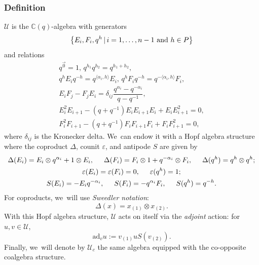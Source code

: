 \documentclass[JEP,XML,SOM,Unicode,published]{cedram}
\let\epsilon\varepsilon
\theoremstyle{definition}
\newcommand{\CC}{\mathbb{C}}
\newcommand{\UU}{\mathcal{U}}
\newcommand{\ad}{\mathrm{ad}}
\begin{document}
\subsubsection{Definition}
$\mathcal{U}$ is the $\CC(q)$-algebra with generators
\[
\left\{ E_i, F_i, q^h\, |\, i=1,\ldots, n-1\hbox{ and }h\in P \right\}
\]
and relations
\begin{gather*}
q^{\vec{0}}=1,\,q^{h_1}q^{h_2}=q^{h_1+h_2},\\
q^hE_iq^{-h}=q^{\langle\alpha_i,h\rangle}E_i,\,q^hF_iq^{-h}=q^{-\langle\alpha_i,h\rangle}F_i,\\
E_iF_j-F_jE_i=\delta_{ij}\dfrac{q^{\alpha_i}-q^{-\alpha_i}}{q-q^{-1}},\\
E_i^2E_{i+1}-(q+q^{-1})E_iE_{i+1}E_i+E_iE_{i+1}^2=0,\\
F_i^2F_{i+1}-(q+q^{-1})F_iF_{i+1}F_i+F_iF_{i+1}^2=0,
\end{gather*}
where $\delta_{ij}$ is the Kronecker delta. We~can endow it with a Hopf algebra structure where the coproduct $\Delta$, counit $\epsilon$, and antipode $S$ are given by
\begin{gather*}
\Delta(E_i)=E_i\otimes q^{\alpha_i}+1\otimes E_i,\hspace{.5cm}\Delta(F_i)=F_i\otimes 1+q^{-\alpha_i}\otimes F_i,\hspace{.5cm}\Delta(q^h)=q^h\otimes q^h;\\
\epsilon(E_i)=\epsilon(F_i)=0,\hspace{.5cm}\epsilon(q^h)=1;\\
S(E_i)=-E_iq^{-\alpha_i},\hspace{.5cm}S(F_i)=-q^{\alpha_i}F_i,\hspace{.5cm}S(q^h)=q^{-h}.
\end{gather*}
For coproducts, we~will use \textit{Sweedler notation}:
\[
\Delta(x)=x_{(1)}\otimes x_{(2)}.
\]
With this Hopf algebra structure, $\mathcal{U}$ acts on itself via the \textit{adjoint} action: for $u,v\in\UU$,
\[
\ad_v u:=v_{(1)}uS (v_{(2)}).
\]
Finally, we~will denote by $\mathcal{U}_c$ the same algebra equipped with the co-opposite coalgebra structure.
\end{document}
